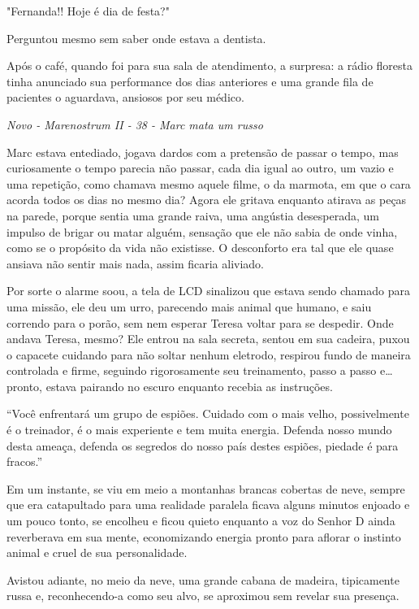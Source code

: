 "Fernanda!! Hoje é dia de festa?"

Perguntou mesmo sem saber onde estava a dentista.

Após o café, quando foi para sua sala de atendimento, a surpresa: a
rádio floresta tinha anunciado sua performance dos dias anteriores e uma
grande fila de pacientes o aguardava, ansiosos por seu médico.

\asterisc

\emph{Novo - Marenostrum II - 38 - Marc mata um russo}

Marc estava entediado, jogava dardos com a pretensão de passar o tempo,
mas curiosamente o tempo parecia não passar, cada dia igual ao outro, um
vazio e uma repetição, como chamava mesmo aquele filme, o da marmota, em
que o cara acorda todos os dias no mesmo dia? Agora ele gritava enquanto
atirava as peças na parede, porque sentia uma grande raiva, uma angústia
desesperada, um impulso de brigar ou matar alguém, sensação que ele não
sabia de onde vinha, como se o propósito da vida não existisse. O
desconforto era tal que ele quase ansiava não sentir mais nada, assim
ficaria aliviado.

Por sorte o alarme soou, a tela de LCD sinalizou que estava sendo
chamado para uma missão, ele deu um urro, parecendo mais animal que
humano, e saiu correndo para o porão, sem nem esperar Teresa voltar para
se despedir. Onde andava Teresa, mesmo? Ele entrou na sala secreta,
sentou em sua cadeira, puxou o capacete cuidando para não soltar nenhum
eletrodo, respirou fundo de maneira controlada e firme, seguindo
rigorosamente seu treinamento, passo a passo e\ldots{} pronto, estava
pairando no escuro enquanto recebia as instruções.

``Você enfrentará um grupo de espiões. Cuidado com o mais velho,
possivelmente é o treinador, é o mais experiente e tem muita energia.
Defenda nosso mundo desta ameaça, defenda os segredos do nosso país
destes espiões, piedade é para fracos.''

Em um instante, se viu em meio a montanhas brancas cobertas de neve,
sempre que era catapultado para uma realidade paralela ficava alguns
minutos enjoado e um pouco tonto, se encolheu e ficou quieto enquanto a
voz do Senhor D ainda reverberava em sua mente, economizando energia
pronto para aflorar o instinto animal e cruel de sua personalidade.

Avistou adiante, no meio da neve, uma grande cabana de madeira,
tipicamente russa e, reconhecendo-a como seu alvo, se aproximou sem
revelar sua presença.

